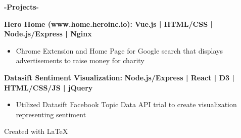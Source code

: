 \documentclass[12pt]{article}
\begin{document}
\colorbox{secondary}{
    \parbox{45em}{
    \color{white}
    \begin{center}
    \textbf{\Large-Projects-}\\
    \end{center}
    \begin{footnotesize}

    \flushleft

    \textbf{\color{primary}\large Hero Home (www.home.heroinc.io):} \hfill \textbf{\color{Cerulean}Vue.js | HTML/CSS | Node.js/Express | Nginx }
    \begin{itemize}
        \item Chrome Extension and Home Page for Google search that displays advertisements to raise money for charity
    \end{itemize}


    \flushleft

    \textbf{\color{primary}\large Datasift Sentiment Visualization:} \hfill \textbf{\color{Cerulean} Node.js/Express | React | D3 | HTML/CSS/JS | jQuery}
    \begin{itemize}
        \item Utilized Datasift Facebook Topic Data API trial to create visualization representing sentiment 
    \end{itemize}

    \end{footnotesize}
}}

\center
Created with \LaTeX
\end{document}
